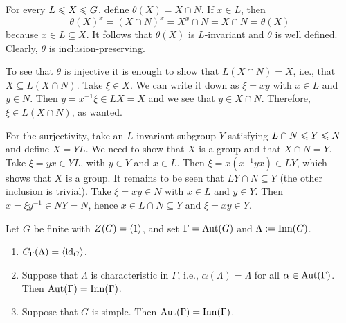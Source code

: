 \begin{solution} For every $L\leqslant X\leqslant G$, define $\theta(X)=X\cap N$. If $x\in L$, then
$$
    \theta(X)^x= (X\cap N)^x = X^x\cap N = X\cap N=\theta(X)
$$
because $x\in L\subseteq X$. It follows that $\theta(X)$ is $L$-invariant and $\theta$ is well defined. Clearly, $\theta$ is inclusion-preserving.

To see that $\theta$ is injective it is enough to show that $L(X\cap N)=X$, i.e., that $X\subseteq L(X\cap N)$. Take $\xi\in X$. We can write it down as $\xi=xy$ with $x\in L$ and $y\in N$. Then $y=x^{-1}\xi\in LX=X$ and we see that $y\in X\cap N$. Therefore, $\xi\in L(X\cap N)$, as wanted.

For the surjectivity, take an $L$-invariant subgroup $Y$ satisfying $L\cap N\leqslant Y\leqslant N$ and define $X=YL$. We need to show that $X$ is a group and that $X\cap N=Y$. Take $\xi=yx\in YL$, with $y\in Y$ and $x\in L$. Then $\xi=x(x^{-1}yx)\in LY$, which shows that $X$ is a group. It remains to be seen that $LY\cap N\subseteq Y$ (the other inclusion is trivial). Take $\xi=xy\in N$ with $x\in L$ and $y\in Y$. Then $x=\xi y^{-1}\in NY=N$, hence $x\in L\cap N\subseteq Y$ and $\xi=xy\in Y$.  \end{solution}

\begin{exr}
    Let\/ $G$ be finite with\/ $Z(G) = \langle1\rangle$, and set\/ $\Gamma = {\rm Aut}(G)$ and\/ $\Lambda := \text{\upshape Inn}(G)$.
    \begin{enumerate}[\upshape a)]
        \item $C_\Gamma(\Lambda) = \langle\operatorname{id}_G\rangle$.
        \item Suppose that\/ $\Lambda$ is characteristic in\/ $\Gamma$, i.e., $\alpha(\Lambda)=\Lambda$ for all\/ $\alpha \in {\rm Aut}(\Gamma)$. Then\/ ${\rm Aut}(\Gamma) = {\rm Inn}(\Gamma)$.
        \item Suppose that\/ $G$ is simple. Then\/ ${\rm Aut}(\Gamma) = {\rm Inn}(\Gamma)$.
    \end{enumerate}
\end{exr}

